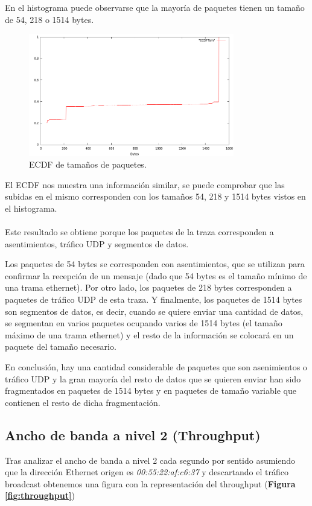 \documentclass[a4paper, 11pt]{article}	%
\begin{document}
En el histograma puede observarse que la mayoría de paquetes tienen un tamaño de 54, 218 o 1514 bytes.

\begin{figure}[H]
\centering
\includegraphics[width=0.8\textwidth]{tam_ecdf.png}
\caption{ECDF de tamaños de paquetes.}
\label{fig:tam_ecdf}
\end{figure}

El ECDF nos muestra una información similar, se puede comprobar que las subidas en el mismo corresponden con los tamaños 54, 218 y 1514 bytes vistos en el histograma.
\\\\
Este resultado se obtiene porque los paquetes de la traza corresponden a asentimientos, tráfico UDP y segmentos de datos.

Los paquetes de 54 bytes se corresponden con asentimientos, que se utilizan para confirmar la recepción de un mensaje (dado que 54 bytes es el tamaño mínimo de una trama ethernet). Por otro lado, los paquetes de 218 bytes corresponden a paquetes de tráfico UDP de esta traza. Y finalmente, los paquetes de 1514 bytes son segmentos de datos, es decir, cuando se quiere enviar una cantidad de datos, se segmentan en varios paquetes ocupando varios de 1514 bytes (el tamaño máximo de una trama ethernet) y el resto de la información se colocará en un paquete del tamaño necesario.

En conclusión, hay una cantidad considerable de paquetes que son asenimientos o tráfico UDP y la gran mayoría del resto de datos que se quieren enviar han sido fragmentados en paquetes de 1514 bytes y en paquetes de tamaño variable que contienen el resto de dicha fragmentación.

\subsection{Ancho de banda a nivel 2 (Throughput)}
Tras analizar el ancho de banda a nivel 2 cada segundo por sentido asumiendo que la dirección Ethernet origen es \textit{00:55:22:af:c6:37} y descartando el tráfico broadcast obtenemos una figura con la representación del throughput (\textbf{Figura \ref{fig:throughput}})
\end{document}
